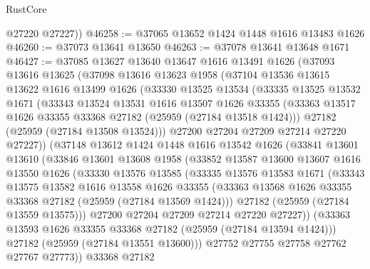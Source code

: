 \begin{lexlean}{RustCore}
\begin{coremodule}
        @27220
        @27227))
@46258 := @37065 @13652 @1424 @1448 @1616 @13483 @1626
@46260 := @37073 @13641 @13650
@46263 := @37078 @13641 @13648 @1671
@46427 := @37085
    @13627
    @13640
    @13647
    @1616
    @13491
    @1626
    (@37093
      @13616
      @13625
      (@37098
        @13616
        @13623
        @1958
        (@37104
          @13536
          @13615
          @13622
          @1616
          @13499
          @1626
          (@33330
            @13525
            @13534
            (@33335
              @13525
              @13532
              @1671
              (@33343
                @13524
                @13531
                @1616
                @13507
                @1626
                @33355
                (@33363 @13517 @1626 @33355 @33368 @27182 (@25959 (@27184 @13518 @1424)))
                @27182
                (@25959 (@27184 @13508 @13524)))
              @27200
              @27204
              @27209
              @27214
              @27220
              @27227))
          (@37148
            @13612
            @1424
            @1448
            @1616
            @13542
            @1626
            (@33841
              @13601
              @13610
              (@33846
                @13601
                @13608
                @1958
                (@33852
                  @13587
                  @13600
                  @13607
                  @1616
                  @13550
                  @1626
                  (@33330
                    @13576
                    @13585
                    (@33335
                      @13576
                      @13583
                      @1671
                      (@33343
                        @13575
                        @13582
                        @1616
                        @13558
                        @1626
                        @33355
                        (@33363 @13568 @1626 @33355 @33368 @27182 (@25959 (@27184 @13569 @1424)))
                        @27182
                        (@25959 (@27184 @13559 @13575)))
                      @27200
                      @27204
                      @27209
                      @27214
                      @27220
                      @27227))
                  (@33363 @13593 @1626 @33355 @33368 @27182 (@25959 (@27184 @13594 @1424)))
                  @27182
                  (@25959 (@27184 @13551 @13600)))
                @27752
                @27755
                @27758
                @27762
                @27767
                @27773))
            @33368
            @27182

\end{coremodule}
\end{lexlean}
